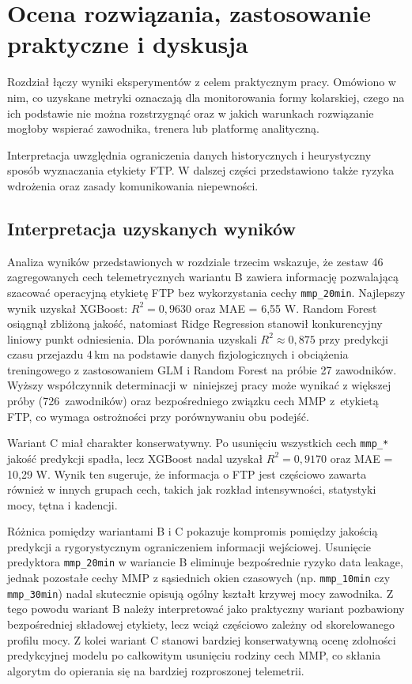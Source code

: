 \chapter{Ocena rozwiązania, zastosowanie praktyczne i dyskusja}

Rozdział łączy wyniki eksperymentów z celem praktycznym pracy. Omówiono w nim, co uzyskane metryki oznaczają dla monitorowania formy kolarskiej, czego na ich podstawie nie można rozstrzygnąć oraz w jakich warunkach rozwiązanie mogłoby wspierać zawodnika, trenera lub platformę analityczną.

Interpretacja uwzględnia ograniczenia danych historycznych i heurystyczny sposób wyznaczania etykiety FTP. W dalszej części przedstawiono także ryzyka wdrożenia oraz zasady komunikowania niepewności.

\section{Interpretacja uzyskanych wyników}

Analiza wyników przedstawionych w rozdziale trzecim wskazuje, że zestaw 46 zagregowanych cech telemetrycznych wariantu B zawiera informację pozwalającą szacować operacyjną etykietę FTP bez wykorzystania cechy \texttt{mmp\_20min}. Najlepszy wynik uzyskał XGBoost: $R^2 = 0{,}9630$ oraz MAE = 6{,}55 W. Random Forest osiągnął zbliżoną jakość, natomiast Ridge Regression stanowił konkurencyjny liniowy punkt odniesienia. Dla porównania \textcite{vos2025cycling_ml} uzyskali $R^2 \approx 0{,}875$ przy predykcji czasu przejazdu 4\,km na podstawie danych fizjologicznych i obciążenia treningowego z zastosowaniem GLM i Random Forest na próbie 27 zawodników. Wyższy współczynnik determinacji w~niniejszej pracy może wynikać z większej próby (726~zawodników) oraz bezpośredniego związku cech MMP z~etykietą FTP, co wymaga ostrożności przy porównywaniu obu podejść.

Wariant C miał charakter konserwatywny. Po usunięciu wszystkich cech \texttt{mmp\_*} jakość predykcji spadła, lecz XGBoost nadal uzyskał $R^2 = 0{,}9170$ oraz MAE = 10{,}29 W. Wynik ten sugeruje, że informacja o FTP jest częściowo zawarta również w innych grupach cech, takich jak rozkład intensywności, statystyki mocy, tętna i kadencji.

Różnica pomiędzy wariantami B i C pokazuje kompromis pomiędzy jakością predykcji a rygorystycznym ograniczeniem informacji wejściowej. Usunięcie predyktora \texttt{mmp\_20min} w wariancie B eliminuje bezpośrednie ryzyko data leakage, jednak pozostałe cechy MMP z sąsiednich okien czasowych (np. \texttt{mmp\_10min} czy \texttt{mmp\_30min}) nadal skutecznie opisują ogólny kształt krzywej mocy zawodnika. Z tego powodu wariant B należy interpretować jako praktyczny wariant pozbawiony bezpośredniej składowej etykiety, lecz wciąż częściowo zależny od skorelowanego profilu mocy. Z kolei wariant C stanowi bardziej konserwatywną ocenę zdolności predykcyjnej modelu po całkowitym usunięciu rodziny cech MMP, co skłania algorytm do opierania się na bardziej rozproszonej telemetrii.

